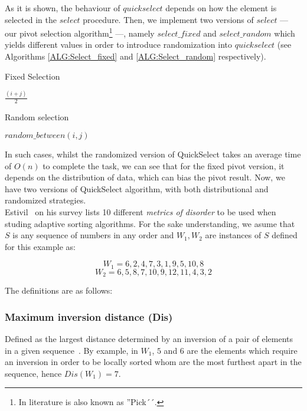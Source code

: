 As it is shown, the behaviour of $quickselect$ depends on how the element is selected in the $select$ procedure. Then, we implement two versions of $select$ --- our pivot selection algorithm\footnote{In literature is also known as ''Pick´´.} ---, namely $select\_fixed$ and $select\_random$ which yields different values in order to introduce randomization into $quickselect$ (see Algorithms \ref{ALG:Select_fixed} and \ref{ALG:Select_random} respectively).\\

\begin{algorithm}
  \caption{Fixed Selection}\label{ALG:Select_fixed}
  \begin{algorithmic}[1]
    \State \Return $\frac{(i+j)}{2}$
    \EndProcedure
  \end{algorithmic}
\end{algorithm}

\begin{algorithm}
  \caption{Random selection}\label{ALG:Select_random}
  \begin{algorithmic}[1]
    \State \Return $random\_between(i,j)$
    \EndProcedure
  \end{algorithmic}
\end{algorithm}

In such cases, whilst the randomized version of QuickSelect takes an average time of $O(n)$ to complete the task, we can see that for the fixed pivot version, it depends on the distribution of data, which can bias the pivot result. Now, we have two versions of QuickSelect algorithm, with both distributional and randomized strategies.\\

Estivil~\cite{estivil92} on his survey lists 10 different \textit{metrics of disorder} to be used when studing adaptive sorting algorithms. For the sake understanding, we asume that $S$ is any sequence of numbers in any order and $W_1,W_2$ are instances of $S$ defined for this example as: 

$$W_1 = {6,2,4,7,3,1,9,5,10,8}$$
$$W_2 = {6,5,8,7,10,9,12,11,4,3,2}$$

The definitions are as follows:

\subsubsection{Maximum inversion distance (Dis)}
Defined as the largest distance determined by an inversion of a pair of elements in a given sequence~\cite{Estivill-Castro_Wood_1989}.  By example, in $W_1$,  $5$ and $6$ are the elements which require an inversion in order to be locally sorted whom are the most furthest apart in the sequence, hence $Dis(W_1) = 7$.\\

